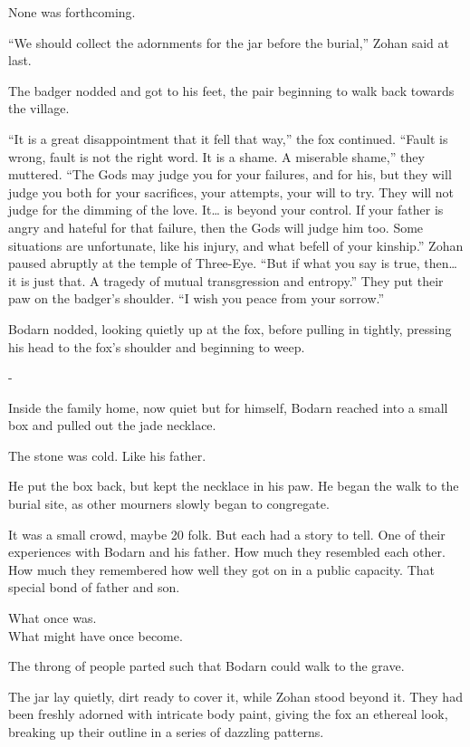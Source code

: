 None was forthcoming.

``We should collect the adornments for the jar before the burial,'' Zohan said at last.

The badger nodded and got to his feet, the pair beginning to walk back towards the village.

``It is a great disappointment that it fell that way,'' the fox continued. ``Fault is wrong, fault is not the right word. It is a shame. A miserable shame,'' they muttered. ``The Gods may judge you for your failures, and for his, but they will judge you both for your sacrifices, your attempts, your will to try. They will not judge for the dimming of the love. It\ldots{} is beyond your control. If your father is angry and hateful for that failure, then the Gods will judge him too. Some situations are unfortunate, like his injury, and what befell of your kinship.'' Zohan paused abruptly at the temple of Three-Eye. ``But if what you say is true, then\ldots{} it is just that. A tragedy of mutual transgression and entropy.'' They put their paw on the badger's shoulder. ``I wish you peace from your sorrow.''

Bodarn nodded, looking quietly up at the fox, before pulling in tightly, pressing his head to the fox's shoulder and beginning to weep.

-

Inside the family home, now quiet but for himself, Bodarn reached into a small box and pulled out the jade necklace.

The stone was cold. Like his father.

He put the box back, but kept the necklace in his paw. He began the walk to the burial site, as other mourners slowly began to congregate.

It was a small crowd, maybe 20 folk. But each had a story to tell. One of their experiences with Bodarn and his father. How much they resembled each other. How much they remembered how well they got on in a public capacity. That special bond of father and son.

What once was.\\
What might have once become.

The throng of people parted such that Bodarn could walk to the grave.

The jar lay quietly, dirt ready to cover it, while Zohan stood beyond it. They had been freshly adorned with intricate body paint, giving the fox an ethereal look, breaking up their outline in a series of dazzling patterns.

